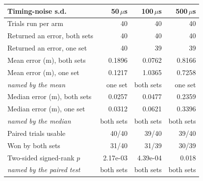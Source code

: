 \begin{tabular}{lrrr}
\toprule
Timing-noise s.d. & 50\,$\mu$s & 100\,$\mu$s & 500\,$\mu$s \\
\midrule
Trials run per arm & 40 & 40 & 40 \\
Returned an error, both sets & 40 & 40 & 40 \\
Returned an error, one set & 40 & 39 & 39 \\
\midrule
Mean error (m), both sets & 0.1896 & 0.0762 & 0.8166 \\
Mean error (m), one set & 0.1217 & 1.0365 & 0.7258 \\
\quad \emph{named by the mean} & one set & both sets & one set \\
\midrule
Median error (m), both sets & 0.0257 & 0.0477 & 0.2359 \\
Median error (m), one set & 0.0312 & 0.0621 & 0.3396 \\
\quad \emph{named by the median} & both sets & both sets & both sets \\
\midrule
Paired trials usable & 40/40 & 39/40 & 39/40 \\
Won by both sets & 31/40 & 31/39 & 30/39 \\
Two-sided signed-rank $p$ & 2.17e-03 & 4.39e-04 & 0.018 \\
\quad \emph{named by the paired test} & both sets & both sets & both sets \\
\bottomrule
\end{tabular}
